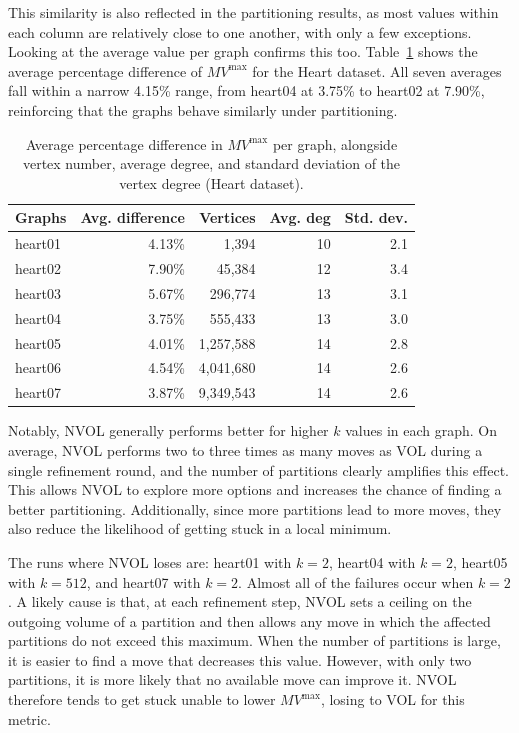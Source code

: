 This similarity is also reflected in the partitioning results, as most values within each column are relatively close to one another, with only a few exceptions. Looking at the average value per graph confirms this too. Table~\ref{tab:heart_METISvsNVOL_avgs} shows the average percentage difference of $MV^{\mathrm{max}}$ for the Heart dataset. All seven averages fall within a narrow 4.15\% range, from heart04 at 3.75\% to heart02 at 7.90\%, reinforcing that the graphs behave similarly under partitioning.
 \begin{table}[h]
 	\centering
 	\begin{tabular}{|l|r|r|r|r|}
 		\hline
 		\textbf{Graphs} & \textbf{Avg. difference} & \textbf{Vertices} & \textbf{Avg. deg} & \textbf{Std. dev.}\\
 		\hline
 		heart01 & 4.13\% & 1,394 & 10 & 2.1\\
 		\hline
 		heart02 & 7.90\% & 45,384 & 12 & 3.4\\
 		\hline
 		heart03 & 5.67\% & 296,774 & 13 & 3.1\\
 		\hline
		heart04 & 3.75\% & 555,433 & 13 & 3.0\\
 		\hline
 		heart05 & 4.01\% & 1,257,588 & 14 & 2.8\\
 		\hline
 		heart06 & 4.54\% & 4,041,680 & 14 & 2.6\\
 		\hline
 		heart07 & 3.87\% & 9,349,543 & 14 & 2.6\\
		\hline 		
 	\end{tabular}
	\caption{Average percentage difference in $MV^{\mathrm{max}}$ per graph, alongside vertex number, average degree, and standard deviation of the vertex degree (Heart dataset).}
 	\label{tab:heart_METISvsNVOL_avgs}
 \end{table}

Notably, NVOL generally performs better for higher $k$ values in each graph. On average, NVOL performs two to three times as many moves as VOL during a single refinement round, and the number of partitions clearly amplifies this effect. This allows NVOL to explore more options and increases the chance of finding a better partitioning. Additionally, since more partitions lead to more moves, they also reduce the likelihood of getting stuck in a local minimum.

The runs where NVOL loses are: heart01 with $k=2$, heart04 with $k=2$, heart05 with $k=512$, and heart07 with $k=2$. Almost all of the failures occur when $k=2$. A likely cause is that, at each refinement step, NVOL sets a ceiling on the outgoing volume of a partition and then allows any move in which the affected partitions do not exceed this maximum. When the number of partitions is large, it is easier to find a move that decreases this value. However, with only two partitions, it is more likely that no available move can improve it. NVOL therefore tends to get stuck unable to lower $MV^{\mathrm{max}}$, losing to VOL for this metric.

